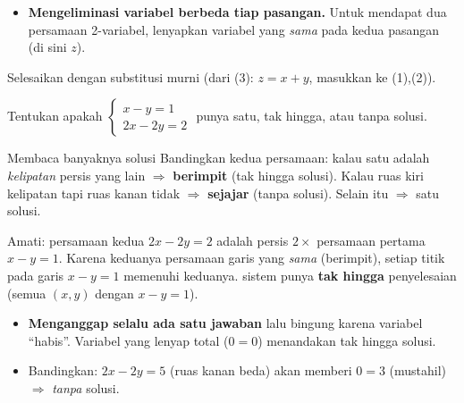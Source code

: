 \begin{jebakan}
\begin{itemize}[leftmargin=*,topsep=2pt]
  \item \textbf{Mengeliminasi variabel berbeda tiap pasangan.} Untuk mendapat
  dua persamaan 2-variabel, lenyapkan variabel yang \emph{sama} pada kedua
  pasangan (di sini $z$).
\end{itemize}
\end{jebakan}

\begin{variasi}
Selesaikan dengan substitusi murni (dari (3): $z=x+y$, masukkan ke (1),(2)).
\end{variasi}

\begin{soalbox}{}
Tentukan apakah $\begin{cases} x-y=1\\ 2x-2y=2\end{cases}$ punya satu, tak
hingga, atau tanpa solusi.
\end{soalbox}

\begin{ingat}{Membaca banyaknya solusi}
Bandingkan kedua persamaan: kalau satu adalah \emph{kelipatan} persis yang lain
$\Rightarrow$ \textbf{berimpit} (tak hingga solusi). Kalau ruas kiri kelipatan
tapi ruas kanan tidak $\Rightarrow$ \textbf{sejajar} (tanpa solusi). Selain itu
$\Rightarrow$ satu solusi.
\end{ingat}

\jawab
{} Amati: persamaan kedua $2x-2y=2$ adalah persis $2\times$ persamaan
pertama $x-y=1$.
 Karena keduanya persamaan garis yang \emph{sama} (berimpit), setiap
titik pada garis $x-y=1$ memenuhi keduanya.
\jadi sistem punya \textbf{tak hingga} penyelesaian (semua $(x,y)$ dengan
$x-y=1$).

\begin{jebakan}
\begin{itemize}[leftmargin=*,topsep=2pt]
  \item \textbf{Menganggap selalu ada satu jawaban} lalu bingung karena
  variabel ``habis''. Variabel yang lenyap total ($0=0$) menandakan tak hingga
  solusi.
  \item Bandingkan: $2x-2y=5$ (ruas kanan beda) akan memberi $0=3$
  (mustahil) $\Rightarrow$ \emph{tanpa} solusi.
\end{itemize}
\end{jebakan}


